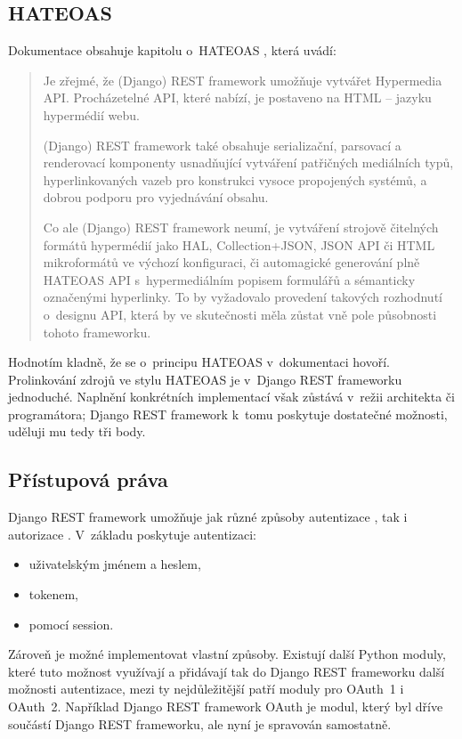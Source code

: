 \subsection{HATEOAS}\label{hateoas}

Dokumentace obsahuje kapitolu o~HATEOAS \autocite{djangoresthateoas}, která uvádí:

\begin{quote}
Je zřejmé, že (Django) REST framework umožňuje vytvářet Hypermedia API. Procházetelné API, které nabízí, je postaveno na HTML -- jazyku hypermédií webu.

(Django) REST framework také obsahuje serializační, parsovací a renderovací komponenty usnadňující vytváření patřičných mediálních typů, hyperlinkovaných vazeb pro konstrukci vysoce propojených systémů, a dobrou podporu pro vyjednávání obsahu.

Co ale (Django) REST framework neumí, je vytváření strojově čitelných formátů hypermédií jako HAL, Collection+JSON, JSON API či HTML mikroformátů ve výchozí konfiguraci, či automagické generování plně HATEOAS API s~hypermediálním popisem formulářů a sémanticky označenými hyperlinky. To by vyžadovalo provedení takových rozhodnutí o~designu API, která by ve skutečnosti měla zůstat vně pole působnosti tohoto frameworku.
\end{quote}

Hodnotím kladně, že se o~principu HATEOAS v~dokumentaci hovoří. Prolinkování zdrojů ve stylu HATEOAS je v~Django REST frameworku jednoduché. Naplnění konkrétních implementací však zůstává v~režii architekta či programátora; Django REST framework k~tomu poskytuje dostatečné možnosti, uděluji mu tedy tři body.

\subsection{Přístupová práva}\label{pux159uxedstupovuxe1-pruxe1va}

Django REST framework umožňuje jak různé způsoby autentizace \autocite{djangorestauth}, tak i autorizace \autocite{djangorestperm}. V~základu poskytuje autentizaci:

\begin{itemize}
\tightlist
\item
  uživatelským jménem a heslem,
\item
  tokenem,
\item
  pomocí session.
\end{itemize}

Zároveň je možné implementovat vlastní způsoby. Existují další Python moduly, které tuto možnost využívají a přidávají tak do Django REST frameworku další možnosti autentizace, mezi ty nejdůležitější patří moduly pro OAuth~1 i OAuth~2. Například Django REST framework OAuth je modul, který byl dříve součástí Django REST frameworku, ale nyní je spravován samostatně.

